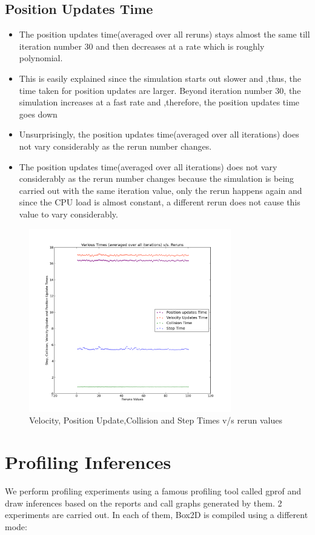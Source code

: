 \documentclass[11pt]{article}
\begin{document}
\subsection{Position Updates Time}
	\begin{itemize}
		\item The position updates time(averaged over all reruns) stays almost the same till iteration number 30 and then decreases at a rate which is roughly polynomial.
		\item This is easily explained since the simulation starts out slower and ,thus, the time taken for position updates are larger. Beyond iteration number 30, the simulation increases at a fast rate and ,therefore, the position updates time goes down
		\item Unsurprisingly, the position updates time(averaged over all iterations) does not vary considerably as the rerun number changes.
		\item The position updates time(averaged over all iterations) does not vary considerably as the rerun number changes because the simulation is being carried out with the same iteration value, only the rerun happens again and since the CPU load is almost constant, a different rerun does not cause this value to vary considerably.
	\end{itemize}
\begin{figure}[h!]
\caption{Velocity, Position Update,Collision and Step Times v/s rerun values}
\centering
\includegraphics[height=8cm]{images/g19_proj_plot04}
\end{figure}

\section{Profiling Inferences}
We perform profiling experiments using a famous profiling tool called gprof and draw inferences based on the reports and call graphs generated by them. 2 experiments are carried out. In each of them, Box2D is compiled using a different mode:
	
\end{document}

